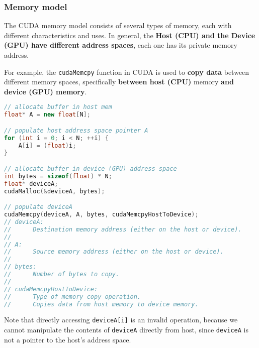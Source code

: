 \subsubsection{Memory model}

The CUDA memory model consists of several types of memory, each with different characteristics and uses. In general, the \textbf{Host (CPU) and the Device (GPU) have different address spaces}, each one has its private memory address.

\highspace
For example, the \texttt{cudaMemcpy} function in CUDA is used to \textbf{copy data} between different memory spaces, specifically \textbf{between host (CPU)} memory \textbf{and device (GPU) memory}.

\begin{lstlisting}[language=C++]
// allocate buffer in host mem
float* A = new float[N];

// populate host address space pointer A
for (int i = 0; i < N; ++i) {
    A[i] = (float)i;
}

// allocate buffer in device (GPU) address space
int bytes = sizeof(float) * N;
float* deviceA;
cudaMalloc(&deviceA, bytes);

// populate deviceA
cudaMemcpy(deviceA, A, bytes, cudaMemcpyHostToDevice);
// deviceA:
//      Destination memory address (either on the host or device).
//
// A:
//      Source memory address (either on the host or device).
//
// bytes:
//      Number of bytes to copy.
//
// cudaMemcpyHostToDevice:
//      Type of memory copy operation.
//      Copies data from host memory to device memory.
\end{lstlisting}
Note that directly accessing \texttt{deviceA[i]} is an invalid operation, because we cannot manipulate the contents of \texttt{deviceA} directly from host, since \texttt{deviceA} is not a pointer to the host's address space.

\newpage

